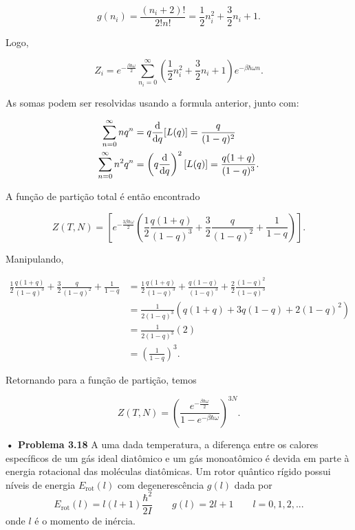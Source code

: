 \documentclass[12pt]{article}
\begin{document}
\begin{equation}
    g(n_i) = \frac{(n_i + 2)!}{2!n!} = \frac{1}{2}n_i^2 + \frac{3}{2} n_i + 1.
\end{equation}

Logo,

\begin{equation}
    Z_i = e^{-\frac{\beta\hbar\omega}{2}}\sum_{n_i=0}^{\infty}\left(\frac{1}{2}n_i^2+\frac{3}{2}n_i+1\right)e^{-\beta\hbar\omega n}.
\end{equation}

As somas podem ser resolvidas usando a formula anterior, junto com:

\begin{align}
    \sum_{n=0}^\infty n q^n &= q \dv{q}[L(q)]  =\frac{q}{(1-q)^2}\\
    \sum_{n=0}^\infty n^2q^n &= \left(q \dv{q}\right)^2[L(q)] = \frac{q(1+q)}{(1-q)^3}.
\end{align}

A função de partição total é então encontrado

\begin{equation}
    Z(T,N) = \left[e^{-\frac{3\beta\hbar\omega}{2}}\left(\frac{1}{2}\frac{q(1+q)}{(1-q)^3} + \frac{3}{2}\frac{q}{(1-q)^2}+\frac{1}{1-q}\right)\right].
\end{equation}

Manipulando,

\begin{align}
    \frac{1}{2}\frac{q(1+q)}{(1-q)^3} + \frac{3}{2}\frac{q}{(1-q)^2}+\frac{1}{1-q} &= \frac{1}{2}\frac{q(1+q)}{(1-q)^3}+\frac{q(1-q)}{(1-q)^3} + \frac{2}{2}\frac{(1-q)^2}{(1-q)^3}\\
    &= \frac{1}{2(1-q)^3}\left(q(1+q) + 3q(1-q) + 2(1-q)^2\right)\\
    &=\frac{1}{2(1-q)^3}(2)\\
    &=\left(\frac{1}{1-q}\right)^3.
\end{align}

Retornando para a função de partição, temos

\begin{equation}
    Z(T,N) = \left(\frac{e^{-\frac{\beta\hbar\omega}{2}}}{1-e^{-\beta\hbar\omega}}\right)^{3N}.
\end{equation}

\textbf{• Problema 3.18} A uma dada temperatura, a diferença entre os calores específicos de um gás ideal diatômico e um gás monoatômico é devida em parte à energia rotacional das moléculas diatômicas. Um rotor quântico rígido possui níveis de energia $E_\text{rot}(l)$ com degenerescência $g(l)$ dada por 
\[
E_{\text{rot}}(l) = l(l+1) \frac{\hbar^2}{2I} \qquad g(l) = 2l + 1 \qquad l = 0, 1, 2, ...
\]
 onde $l$ é o momento de inércia.
 
\end{document}

